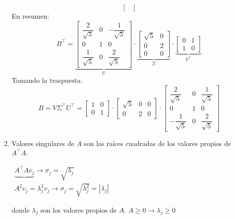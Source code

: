 \begin{enumerate}[label=\color{red}\textbf{\arabic*)}, leftmargin=*]
\[\begin{bmatrix}
		\end{bmatrix} \]En resumen:\[ B^\intercal=\underbrace{\begin{bmatrix}
			\dfrac{2}{\sqrt{5}} & 0 & -\dfrac{1}{\sqrt{5}}\\
			0 & 1 & 0\\
			\dfrac{1}{\sqrt{5}} & 0 & \dfrac{2}{\sqrt{5}}
			\end{bmatrix}}_U\cdot\underbrace{\begin{bmatrix}
			\sqrt{5} & 0\\
			0 & 2\\
			0 & 0
		\end{bmatrix}}_{\Sigma}\cdot\underbrace{\begin{bmatrix}
		0 &1\\
		1 & 0
	\end{bmatrix}}_{V^\intercal} \]Tomando la traspuesta:\[ B=V\Sigma^\intercal U^\intercal=\begin{bmatrix}
	1 & 0\\
	0 & 1
\end{bmatrix}\cdot\begin{bmatrix}
\sqrt{5} & 0& 0\\
0 & 2 & 0
\end{bmatrix}\cdot\begin{bmatrix}
\dfrac{2}{\sqrt{5}} & 0 & \dfrac{1}{\sqrt{5}}\\
0 & 1 & 0\\
-\dfrac{1}{\sqrt{5}} & 0 & \dfrac{2}{\sqrt{5}}
\end{bmatrix} \]
	\item {}
	
	
	Valores singulares de $A$ son las raíces cuadradas de los valores propios de $A^\intercal A$.
	
	$\begin{array}{l}
		\underbrace{A^\intercal Av_j}\longrightarrow\sigma_j=\sqrt{\lambda_j}\\
		A^2v_j=\lambda_j^2v_j\longrightarrow\sigma_j=\sqrt{\lambda_j^2}=|\lambda_j|
	\end{array}$
	
	donde $\lambda_j$ son los valores propios de $A$. $A\ge0\longrightarrow\lambda_j\ge0$
\end{enumerate}